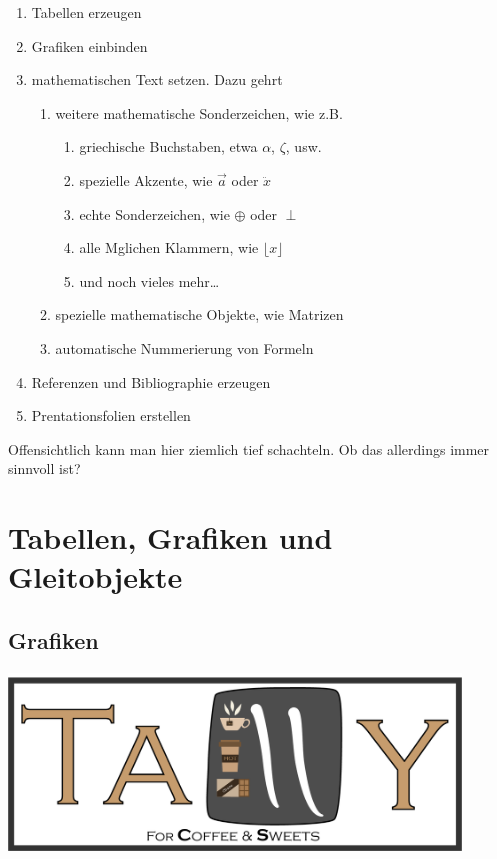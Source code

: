 \documentclass[11pt,a4paper]{article} %
\begin{document}
\begin{enumerate}
 \item Tabellen erzeugen
 \item Grafiken einbinden
 \item mathematischen Text setzen. Dazu gehrt
    \begin{enumerate}
       \item weitere mathematische Sonderzeichen, wie z.B.
           \begin{enumerate}
               \item griechische Buchstaben, etwa $\alpha$, $\zeta$, usw.
               \item spezielle Akzente, wie $\vec{a}$ oder $\ddot{x}$
               \item echte Sonderzeichen, wie $\oplus$ oder $\perp$
               \item alle Mglichen Klammern, wie $\lfloor x \rfloor$
               \item und noch vieles mehr\ldots
           \end{enumerate}
       \item spezielle mathematische Objekte, wie Matrizen
       \item automatische Nummerierung von Formeln
    \end{enumerate}
 \item Referenzen und Bibliographie erzeugen
 \item Prentationsfolien erstellen
\end{enumerate}

Offensichtlich kann man hier ziemlich tief schachteln. Ob das allerdings immer sinnvoll ist?



\section{Tabellen, Grafiken und Gleitobjekte}
\label{TabellenGrafikenFloats}


\subsection{Grafiken}
\label{Grafiken}


\begin{center}
\includegraphics[width=12cm]{TallyLogo.png}
\end{center}
\end{document}
